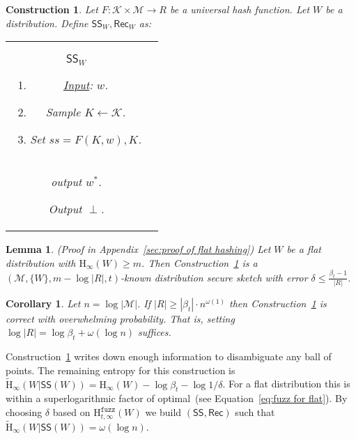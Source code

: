 \documentclass[11pt]{article}
\newcommand{\supp}{\operatorname{supp}}
\newcommand{\apref}[1]{\mbox{Appendix~\ref{#1}}}
\newcommand{\consref}[1]{\mbox{Construction~\ref{#1}}}
\newcommand{\class}[1]{{\ensuremath{\mathsf{#1}}}}
\newcommand{\sketch}{\ensuremath{\class{SS}}\xspace}
\newcommand{\rec}{\ensuremath{\class{Rec}}\xspace}
\newcommand{\dis}{\ensuremath{\mathsf{dis}}}
\newcommand{\Hoo}{\mathrm{H}_\infty}
\newcommand{\Hav}{\tilde{\mathrm{H}}_\infty}
\newcommand{\Hfuzz}{\mathrm{H}^{\mathtt{fuzz}}_{t,\infty}}
\newtheorem{lemma}[theorem]{Lemma}
\newtheorem{corollary}[theorem]{Corollary}
\newtheorem{construction}[theorem]{Construction}
\begin{document}
\begin{construction}
\label{cons:universal hash}
Let $F :\mathcal{K}\times \mathcal{M}\rightarrow R$ be a universal hash function.  Let $W$ be a distribution.  Define $\sketch_W, \rec_W$ as:

\begin{center}
\begin{tabular}{c|c}
\begin{minipage}{2.5in}
\textbf{$\sketch_W$}
\begin{enumerate}
\item \underline{Input}: $w$.
\item Sample $K\leftarrow \mathcal{K}$.
\item Set $ss = F(K, w), K$.
\end{enumerate}
\vspace{.3in}
\end{minipage} &
\begin{minipage}{3.5in}
\textbf{$\rec_W$}
\begin{enumerate}
\item \underline{Input}: $(w', ss =( y, K))$
\item Let $W^* = \{w \in \supp(W) | \dis(w, w')\le t\}$.
\item For $w^*\in W^*$, if $F(K, w^*) = y$, \\ output $w^*$.
\item Output $\perp$.
\end{enumerate}
\end{minipage}
\end{tabular}
\end{center}
\end{construction}

\begin{lemma}
\label{lem:flat hashing} (Proof in \apref{sec:proof of flat hashing})
Let $W$ be a flat distribution with $\Hoo(W)\ge m$.  Then
\consref{cons:universal hash} is a $(\mathcal{M}, \{W\}, m - \log |R|, t)$-known distribution secure sketch with error $\delta \le \frac{\beta_{t}-1}{|R|}$. 
\end{lemma}
\begin{corollary}
Let $n = \log |\mathcal{M}|$.  If $|R| \ge |\beta_{t}|\cdot n^{\omega(1)}$ then \consref{cons:universal hash} is correct with overwhelming probability.  That is, setting $\log |R| = \log \beta_{t} + \omega(\log n)$ suffices.
\end{corollary}

\noindent
\consref{cons:universal hash} writes down enough information to disambiguate any ball of points.  The remaining entropy for this construction is $\Hav(W |\sketch(W)) = \Hoo(W) - \log \beta_{t} -\log 1/\delta$. For a flat distribution this is within a superlogarithmic factor of optimal~(see Equation~\eqref{eq:fuzz for flat}). By choosing $\delta$ based on $\Hfuzz(W)$ we build $(\sketch, \rec)$ such that $\Hav(W | \sketch(W)) = \omega(\log n)$.
\end{document}
